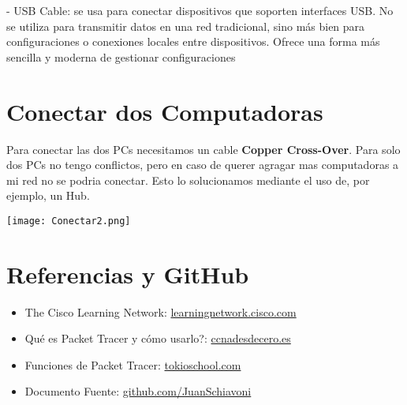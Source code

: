 \documentclass{article}
\begin{document}
- USB Cable: se usa para conectar dispositivos que soporten interfaces USB. No se utiliza para transmitir datos en una red tradicional, sino más bien para configuraciones o conexiones locales entre dispositivos. Ofrece una forma más sencilla y moderna de gestionar configuraciones

\vspace{10pt}
\section{Conectar dos Computadoras}
Para conectar las dos PCs necesitamos un cable \textbf{Copper Cross-Over}. Para solo dos PCs no tengo conflictos, pero en caso de querer agragar mas computadoras a mi red no se podria conectar. Esto lo solucionamos mediante el uso de, por ejemplo, un Hub. 

\begin{center}
    \texttt{[image: Conectar2.png]}
\end{center}

\vspace{10pt}
\section{Referencias y GitHub}

\begin{itemize}
    \item {The Cisco Learning Network}: \href{https://learningnetwork.cisco.com/s/article/el-software-de-simulacion-cisco-packet-tracer}{learningnetwork.cisco.com}
    \item {Qué es Packet Tracer y cómo usarlo?}: \href{https://ccnadesdecero.es/que-es-cisco-packet-tracer/}{ccnadesdecero.es}
    \item {Funciones de Packet Tracer}: \href{https://www.tokioschool.com/noticias/cisco-packet-tracer/}{tokioschool.com}
    \item {Documento Fuente}: \href{https://github.com/JuanSchiavoni/Intro_Packet_Tracer}{github.com/JuanSchiavoni}
\end{itemize}
\end{document}
